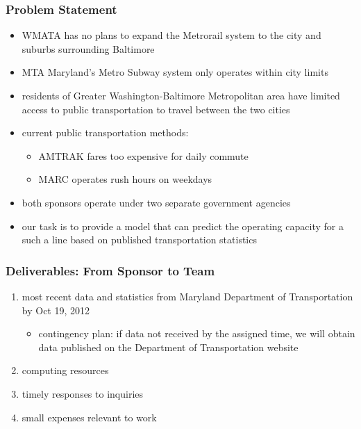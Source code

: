 \documentclass[compress,handout,10pt]{beamer}
\let\olditem\item
\renewcommand{\item}{\setlength{\itemsep}{0.5\baselineskip}\olditem}
\begin{document}
\begin{frame}
    \frametitle{Problem Statement}
    \begin{itemize}
        \item WMATA has no plans to expand the Metrorail system to the city and suburbs surrounding Baltimore
	\item MTA Maryland's Metro Subway system only operates within city limits
	\item residents of Greater Washington-Baltimore Metropolitan area have limited access to public transportation to travel between the two cities
	\item current public transportation methods:
	\begin{itemize}
		\item AMTRAK fares too expensive for daily commute
		\item MARC operates rush hours on weekdays
	\end{itemize}
	\item both sponsors operate under two separate government agencies
	\item our task is to provide a model that can predict the operating capacity for a such a line based on published transportation statistics
    \end{itemize}
\end{frame}

\begin{frame}
    \frametitle{Deliverables: From Sponsor to Team}
    \begin{enumerate}
        \item most recent data and statistics from Maryland Department of Transportation by Oct 19, 2012
	\begin{itemize}
		\item contingency plan: if data not received by the assigned time, we will obtain data published on the Department of Transportation website
	\end{itemize}
	\item computing resources
	\item timely responses to inquiries
	\item small expenses relevant to work
    \end{enumerate}
\end{frame}
\end{document}
